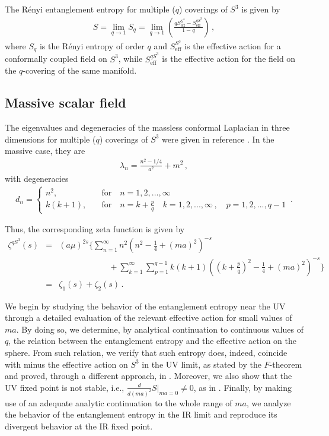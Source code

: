 \documentclass[12pt,a4paper]{article}
\newcommand{\beq}{\begin{eqnarray}}
\newcommand{\eeq}{\end{eqnarray}}
\newcommand{\nn}{\nonumber}
\numberwithin{equation}{section}
\begin{document}
The R\'enyi entanglement entropy for multiple ($q$) coverings of $S^3$ is given by
\beq
S=\lim _{q\rightarrow 1} S_q=\lim _{q\rightarrow 1} \left( \frac{q S_{\mathrm{eff}}^{S^3} - S_{\mathrm{eff}}^{qS^3}}{1-q} \right)\,,
\label{Renyi}
\eeq
where $ S_q$ is the R\'enyi entropy of order $q$ and $S_{\mathrm{eff}}^{S^3}$ is the effective action for a conformally coupled field on $S^3$, while $S_{\mathrm{eff}}^{qS^3}$ is the effective action for the field on the $q$-covering of the same manifold.

\subsection{Massive scalar field}

The eigenvalues and degeneracies of the massless conformal Laplacian in three dimensions for multiple ($q$) coverings of $S^3$ were given in reference \cite{kleRenyi}. In the massive case, they are
\beq
\lambda_n = \frac{n^2 - 1/4}{a^2} + m^2\,,
\eeq
with degeneracies
 \beq
 d_n  =\begin{cases} n^2,&  \quad \mbox{for} \quad n=1,2,..., \infty \\
      k(k+1),& \quad \mbox{for} \quad  n= k+\frac{p}{q} \quad k=1,2,..., \infty\,, \quad p=1,2,...,q-1\end{cases}\,.
\eeq

Thus, the corresponding zeta function is given by
\beq
\zeta^{qS^3}(s)&=& (a \mu)^{2s}\Bigg\{
\sum_{n=1}^{\infty} n^2 \left(n^2 -\frac{1}{4} + (ma)^2\right)^{-s}\nn \\ && \qquad\qquad\qquad+ \sum_{k=1}^{\infty}\sum_{p=1}^{q-1} k(k+1) \left(\left(k + \frac{p}{q}\right)^2 -\frac{1}{4} + (ma)^2\right)^{-s}\Bigg\} \nn \\
&=& \zeta_1 (s) + \zeta_2 (s)\,.\label{zetaq}
\eeq

We begin by studying the behavior of the entanglement entropy near the UV through a detailed evaluation of the relevant effective action for small values of $ma$. By doing so, we determine, by analytical continuation to continuous values of $q$, the relation between the entanglement entropy and the effective action on the sphere. From such relation, we verify that such entropy does, indeed, coincide with minus the effective action on $S^3$ in the UV limit, as stated by the $F$-theorem and proved, through a different approach, in \cite{dowkerentang}. Moreover, we also show that the UV fixed point is not stable, i.e., $\frac{d}{d(ma)^2}\left.S\right\vert_{ma=0}\neq 0$, as in \cite{dowkerrenyi}. Finally, by making use of an adequate analytic continuation to the whole range of $ma$, we analyze the behavior of the entanglement entropy in the IR limit and reproduce its divergent behavior at the IR fixed point.
\end{document}
